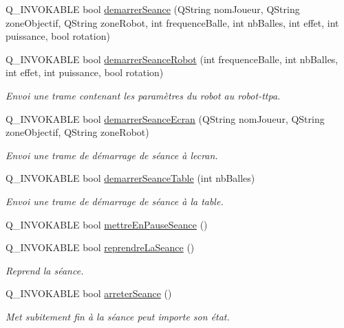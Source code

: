 \begin{DoxyCompactItemize}
Q\+\_\+\+I\+N\+V\+O\+K\+A\+B\+LE bool \hyperlink{class_communication_bluetooth_a546aae742ba77e90f99c4f12fbff908a}{demarrer\+Seance} (Q\+String nom\+Joueur, Q\+String zone\+Objectif, Q\+String zone\+Robot, int frequence\+Balle, int nb\+Balles, int effet, int puissance, bool rotation)
\item 
Q\+\_\+\+I\+N\+V\+O\+K\+A\+B\+LE bool \hyperlink{class_communication_bluetooth_a02e74da6910804557f31e81f26201f89}{demarrer\+Seance\+Robot} (int frequence\+Balle, int nb\+Balles, int effet, int puissance, bool rotation)
\begin{DoxyCompactList}\small\item\em Envoi une trame contenant les paramètres du robot au robot-\/ttpa. \end{DoxyCompactList}\item 
Q\+\_\+\+I\+N\+V\+O\+K\+A\+B\+LE bool \hyperlink{class_communication_bluetooth_a024493f537e8501a813e1555716cf7ad}{demarrer\+Seance\+Ecran} (Q\+String nom\+Joueur, Q\+String zone\+Objectif, Q\+String zone\+Robot)
\begin{DoxyCompactList}\small\item\em Envoi une trame de démarrage de séance à l\textquotesingle{}ecran. \end{DoxyCompactList}\item 
Q\+\_\+\+I\+N\+V\+O\+K\+A\+B\+LE bool \hyperlink{class_communication_bluetooth_abb71c8f555c64d1791d330955ace417c}{demarrer\+Seance\+Table} (int nb\+Balles)
\begin{DoxyCompactList}\small\item\em Envoi une trame de démarrage de séance à la table. \end{DoxyCompactList}\item 
Q\+\_\+\+I\+N\+V\+O\+K\+A\+B\+LE bool \hyperlink{class_communication_bluetooth_ac611820990eee132f457497dd26b63fe}{mettre\+En\+Pause\+Seance} ()
\item 
Q\+\_\+\+I\+N\+V\+O\+K\+A\+B\+LE bool \hyperlink{class_communication_bluetooth_a1bcf85f34d2902ba6fe3b6929b409272}{reprendre\+La\+Seance} ()
\begin{DoxyCompactList}\small\item\em Reprend la séance. \end{DoxyCompactList}\item 
Q\+\_\+\+I\+N\+V\+O\+K\+A\+B\+LE bool \hyperlink{class_communication_bluetooth_a4b0e71c1f161c14278f3ab55b1910c64}{arreter\+Seance} ()
\begin{DoxyCompactList}\small\item\em Met subitement fin à la séance peut importe son état. \end{DoxyCompactList}\item 

\end{DoxyCompactItemize}
